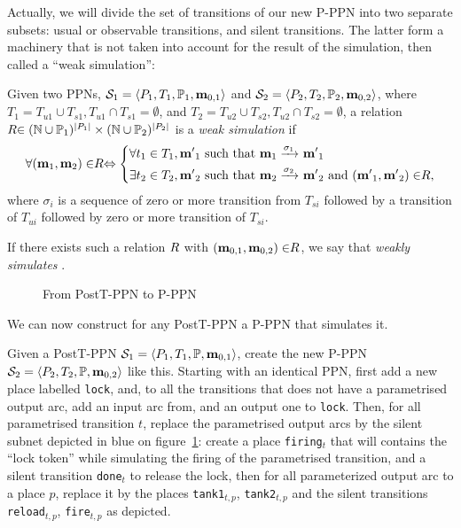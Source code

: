 Actually, we will divide the set of transitions of our new P-PPN into two separate subsets: usual or observable transitions, and silent transitions.
The latter form a machinery that is not taken into account for the result of the simulation, then called a ``weak simulation'':
\begin{defi}
  Given two \acp{PPN}, $\defPPN[1]$ and $\defPPN[2]$,
  where $T_1 = T_{u1} \cup T_{s1}, T_{u1} \cap T_{s1} = \emptyset$,
  and   $T_2 = T_{u2} \cup T_{s2}, T_{u2} \cap T_{s2} = \emptyset$,
  a relation $\rela \in (\naturals \cup  \parameters_1)^{\card{P_1}} \times (\naturals \cup  \parameters_2)^{\card{P_2}}$ is a \emph{weak simulation} if
  \[
    \forall (\mar_1, \mar_2) \in \rela \Leftrightarrow
    \left\{
    \begin{aligned}
      &\forall t_1 \in \transitions_1, \marp_1 \text{ such that } \mar_1 \fire{\sigma_1} \marp_1 \\
      &\exists t_2 \in \transitions_2, \marp_2 \text{ such that } \mar_2 \fire{\sigma_2} \marp_2
        \text{ and } (\marp_1, \marp_2) \in \rela,
    \end{aligned}
    \right.
  \]
where $\sigma_i$ is a sequence of zero or more transition from $T_{si}$ followed by a transition of $T_{ui}$ followed by zero or more transition of $T_{si}$.

  If there exists such a relation $\rela$ with $(\mar_{0,1}, \mar_{0,2}) \in \rela$, we say that \namePPN[2] \emph{weakly simulates} \namePPN[1].
\end{defi}

\begin{figure}[htbp]
  \centering
  
  \par
  \caption{From PostT-PPN to P-PPN}
  \label{fig:posttppn-to-pppn}
\end{figure}


We can now construct for any PostT-PPN a P-PPN that simulates it.

Given a PostT-PPN $\namePPN[1] = \tuple{\places_1, \transitions_1, \parameters, \mar_{0,1}}$, create the new P-PPN $\namePPN[2] = \tuple{\places_2, \transitions_2, \parameters, \mar_{0,2}}$ like this.
Starting with an identical \ac{PPN}, first add a new place labelled \texttt{lock}, and, to all the transitions that does not have a parametrised output arc, add an input arc from, and an output one to \texttt{lock}.
Then, for all parametrised transition $t$, replace the parametrised output arcs by the silent subnet depicted in blue on figure~\ref{fig:posttppn-to-pppn}:
create a place \texttt{firing}$_t$ that will contains the ``lock token'' while simulating the firing of the parametrised transition, and a silent transition \texttt{done}$_t$ to release the lock,
then for all parameterized output arc to a place $p$, replace it by the places \texttt{tank1}$_{t,p}$, \texttt{tank2}$_{t,p}$ and the silent transitions \texttt{reload}$_{t,p}$, \texttt{fire}$_{t,p}$ as depicted.

